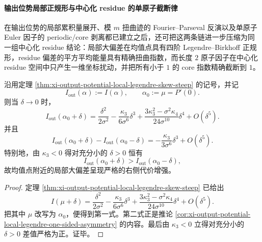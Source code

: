 \paragraph{输出位势局部正规形与中心化 residue 的单原子截断律}
在输出位势的局部累积量展开、模 \(m\) 扭曲迹的 Fourier--Parseval 反演以及单原子 Euler 因子的 periodic/core 剥离都已建立之后，还可把这两条链进一步压缩为同一组中心化 residue 结论：局部大偏差在均值点具有四阶 Legendre--Birkhoff 正规形，residue 偏差的平方平均能量具有精确扭曲指数，而长度 \(2\) 原子因子在中心化 residue 空间中只产生一维坐标扰动，并把所有小于 \(1\) 的 core 指数精确截断到 \(1\)。

\begin{theorem}\label{thm:xi-output-potential-local-legendre-birkhoff-normal-form}
沿用定理 \ref{thm:xi-output-potential-local-legendre-skew-steep} 的记号，并记
\[
I_{\mathrm{out}}(\alpha):=I(\alpha),
\qquad
\alpha_0:=\mu=P'(0).
\]
则当 \(\delta\to 0\) 时，
\[
\boxed{\;
I_{\mathrm{out}}(\alpha_0+\delta)
=
\frac{\delta^2}{2\sigma^2}
-\frac{\kappa_3}{6\sigma^6}\delta^3
+\frac{3\kappa_3^2-\sigma^2\kappa_4}{24\sigma^{10}}\delta^4
+O(\delta^5).\;}
\]
并且
\[
\boxed{\;
I_{\mathrm{out}}(\alpha_0+\delta)-I_{\mathrm{out}}(\alpha_0-\delta)
=
-\frac{\kappa_3}{3\sigma^6}\delta^3+O(\delta^5).\;}
\]
特别地，由 \(\kappa_3<0\) 得对充分小的 \(\delta>0\) 恒有
\[
I_{\mathrm{out}}(\alpha_0+\delta)>I_{\mathrm{out}}(\alpha_0-\delta),
\]
故均值点附近的局部大偏差呈现严格的右侧代价增强。
\end{theorem}
\begin{proof}
定理 \ref{thm:xi-output-potential-local-legendre-skew-steep} 已给出
\[
I(\mu+\delta)
=
\frac{\delta^2}{2\sigma^2}
-\frac{\kappa_3}{6\sigma^6}\delta^3
+\frac{3\kappa_3^2-\sigma^2\kappa_4}{24\sigma^{10}}\delta^4
+O(\delta^5).
\]
把其中 \(\mu\) 改写为 \(\alpha_0\)，便得到第一式。第二式正是推论 \ref{cor:xi-output-potential-local-legendre-one-sided-asymmetry} 的内容。最后由 \(\kappa_3<0\) 立得对充分小的 \(\delta>0\) 差值严格为正。证毕。
\end{proof}

